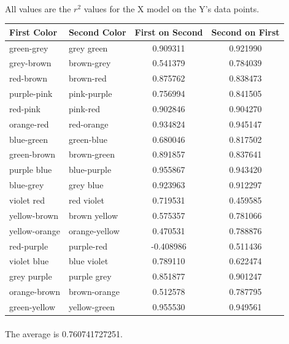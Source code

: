 \documentclass[12pt, letterpaper]{article}
\begin{document}
\paragraph{}All values are the $ r^2$ values for the X model on the Y's data points.
\begin{center}
\begin{tabular}{| l | l | c | c |} \hline
First Color & Second Color & First on Second & Second on First \\ \hline
green-grey & grey green & 0.909311 & 0.921990 \\ \hline
grey-brown & brown-grey & 0.541379 & 0.784039 \\ \hline
red-brown & brown-red & 0.875762 & 0.838473 \\ \hline
purple-pink & pink-purple & 0.756994 & 0.841505 \\ \hline
red-pink & pink-red & 0.902846 & 0.904270 \\ \hline
orange-red & red-orange & 0.934824 & 0.945147 \\ \hline
blue-green & green-blue & 0.680046 & 0.817502 \\ \hline
green-brown & brown-green & 0.891857 & 0.837641 \\ \hline
purple blue & blue-purple & 0.955867 & 0.943420 \\ \hline
blue-grey & grey blue & 0.923963 & 0.912297 \\ \hline
violet red & red violet & 0.719531 & 0.459585 \\ \hline
yellow-brown & brown yellow & 0.575357 & 0.781066 \\ \hline
yellow-orange & orange-yellow & 0.470531 & 0.788876 \\ \hline
red-purple & purple-red & -0.408986 & 0.511436 \\ \hline
violet blue & blue violet & 0.789110 & 0.622474 \\ \hline
grey purple & purple grey & 0.851877 & 0.901247 \\ \hline
orange-brown & brown-orange & 0.512578 & 0.787795 \\ \hline
green-yellow & yellow-green & 0.955530 & 0.949561 \\ \hline
\end{tabular}
\end{center}
\paragraph{} The average is 0.760741727251.
\end{document}
